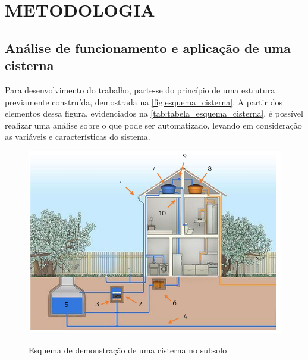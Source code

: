
\chapter{METODOLOGIA}
\label{chap:metodologia}


\section{Análise de funcionamento e aplicação de uma cisterna}

Para desenvolvimento do trabalho, parte-se do princípio de uma estrutura previamente construída, demostrada na \autoref{fig:esquema_cisterna}. A partir dos elementos dessa figura, evidenciados na \autoref{tab:tabela_esquema_cisterna}, é possível realizar uma análise sobre o que pode ser automatizado, levando em consideração as variáveis e características do sistema.  

\begin{figure}[H]
	\centering
	\caption{Esquema de demonstração de uma cisterna no subsolo}
	\includegraphics[width=1.0\textwidth]{figuras/esquema_cisterna.png}
	\label{fig:esquema_cisterna}
\end{figure}

\newpage

